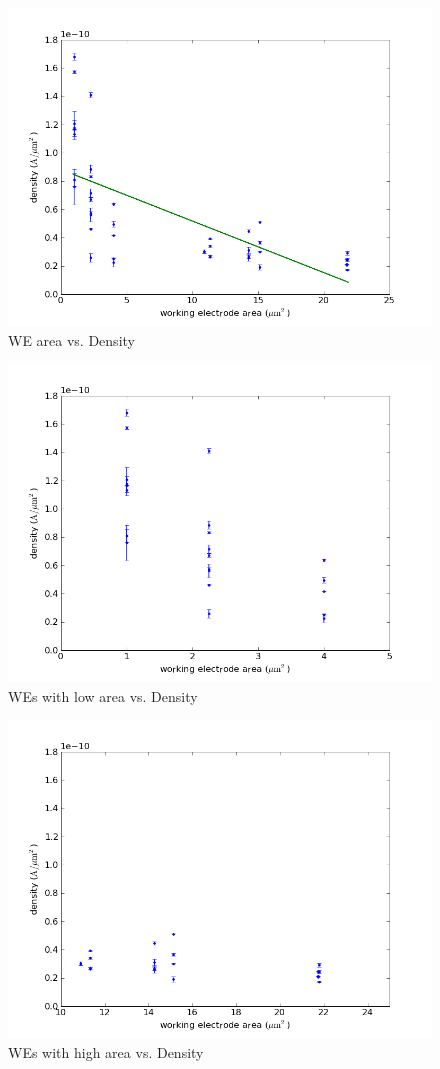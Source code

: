 \begin{figure}
	\centering
	\includegraphics[width=0.7\linewidth]{figures/area_v_density.png}
	\caption{WE area vs. Density}
	\label{area_v_density}
\end{figure}

\begin{figure}
	\centering
	\includegraphics[width=0.7\linewidth]{figures/area_low_v_density.png}
	\caption{WEs with low area vs. Density}
	\label{area_low_v_density}
\end{figure}

\begin{figure}
	\centering
	\includegraphics[width=0.7\linewidth]{figures/area_high_v_density.png}
	\caption{WEs with high area vs. Density}
	\label{area_high_v_density}
\end{figure}

